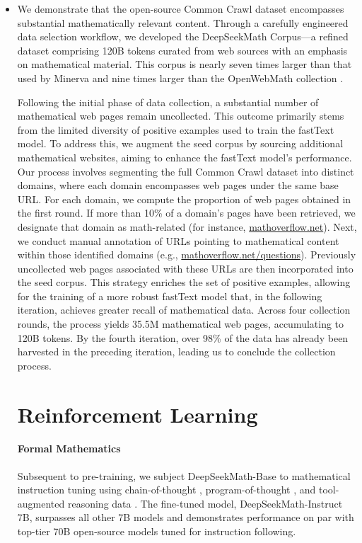 \begin{itemize}[topsep=0pt]
    \item We demonstrate that the open-source Common Crawl dataset encompasses substantial mathematically relevant content. Through a carefully engineered data selection workflow, we developed the DeepSeekMath Corpus—a refined dataset comprising 120B tokens curated from web sources with an emphasis on mathematical material. This corpus is nearly seven times larger than that used by Minerva \citep{minerva} and nine times larger than the OpenWebMath collection \citep{openwebmath}.

Following the initial phase of data collection, a substantial number of mathematical web pages remain uncollected. This outcome primarily stems from the limited diversity of positive examples used to train the fastText model. To address this, we augment the seed corpus by sourcing additional mathematical websites, aiming to enhance the fastText model's performance. Our process involves segmenting the full Common Crawl dataset into distinct domains, where each domain encompasses web pages under the same base URL. For each domain, we compute the proportion of web pages obtained in the first round. If more than 10\% of a domain's pages have been retrieved, we designate that domain as math-related (for instance, \url{mathoverflow.net}). Next, we conduct manual annotation of URLs pointing to mathematical content within those identified domains (e.g., \url{mathoverflow.net/questions}). Previously uncollected web pages associated with these URLs are then incorporated into the seed corpus. This strategy enriches the set of positive examples, allowing for the training of a more robust fastText model that, in the following iteration, achieves greater recall of mathematical data. Across four collection rounds, the process yields 35.5M mathematical web pages, accumulating to 120B tokens. By the fourth iteration, over 98\% of the data has already been harvested in the preceding iteration, leading us to conclude the collection process.

\section{Reinforcement Learning}

\paragraph{Formal Mathematics}

Subsequent to pre-training, we subject DeepSeekMath-Base to mathematical instruction tuning using chain-of-thought \citep{cot}, program-of-thought \citep{pot,pal}, and tool-augmented reasoning data \citep{tora}. The fine-tuned model, DeepSeekMath-Instruct 7B, surpasses all other 7B models and demonstrates performance on par with top-tier 70B open-source models tuned for instruction following.


\end{itemize}
